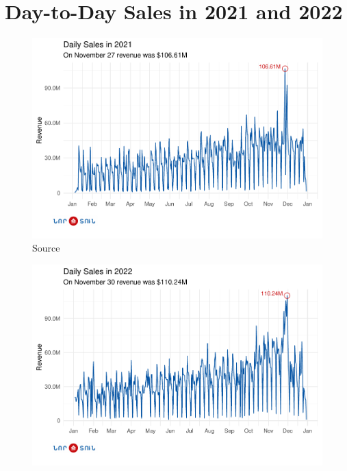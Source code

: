 \documentclass[conference]{IEEEtran}
\begin{document}
\section{Day-to-Day Sales in 2021 and 2022}
\label{app:time-series}
\begin{figure}[htbp]
\centering
\includegraphics[width=\columnwidth,keepaspectratio]{./figures/time_series_2021_sales.pdf}
\caption{Source \cite{TSF}}
\label{fig:time-series-2021}
\end{figure}


\begin{figure}[htbp]
\centering
\includegraphics[width=\columnwidth,keepaspectratio]{./figures/time_series_2022_sales.pdf}
\caption{\cite{TSF}}
\label{fig:time-series-2022}
\end{figure}
\end{document}
